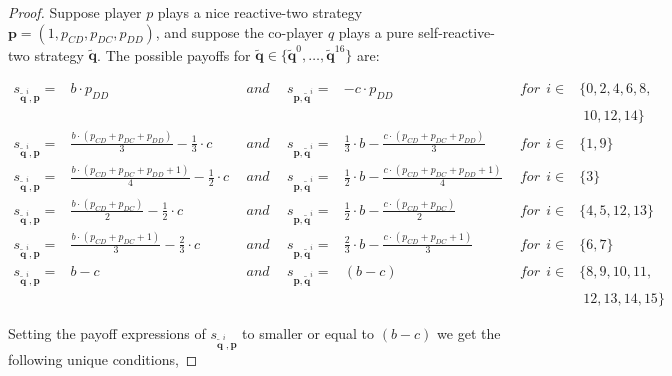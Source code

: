 \documentclass{article}
\theoremstyle{definition}
\begin{document}
\begin{proof}
Suppose player $p$ plays a nice reactive-two strategy $\mathbf{p} = (1, p_{CD},
p_{DC}, p_{DD})$, and suppose the co-player $q$ plays a pure self-reactive-two
strategy $\mathbf{\tilde{q}}$. The possible payoffs for
$\mathbf{\tilde{q}} \in \{\mathbf{\tilde{q}}^{0}, \dots, \mathbf{\tilde{q}}^{16}\}$
are:

\begin{equation*}\label{Eq:PayoffExpressionsReactiveTwo}
  \begin{array}{lcllccl}
    s_{\mathbf{\tilde{q}}^{i}, \mathbf{p}} = & b \cdot p_{DD} & ~~and~~ & s_{\mathbf{\mathbf{p}, \tilde{q}}^{i}} = & -c \cdot p_{DD} & ~~for~~ i \in & \{0, 2, 4, 6, 8, \\
    & & & & & & \; 10, 12, 14\} \\ [1em]
    s_{\mathbf{\tilde{q}}^{i}, \mathbf{p}} = & \frac{b \cdot (p_{CD} + p_{DC} + p_{DD})}{3} - \frac{1}{3} \cdot c  & ~~and~~ &  s_{\mathbf{\mathbf{p}, \tilde{q}}^{i}} = & \frac{1}{3} \cdot b - \frac{c \cdot \left(p_{CD} + p_{DC} + p_{DD}\right)}{3} & ~~for~~ i \in & \{1, 9\} \\ [1em]
    s_{\mathbf{\tilde{q}}^{i}, \mathbf{p}} = & \frac{b \cdot (p_{CD} + p_{DC} + p_{DD} + 1)}{4} - \frac{1}{2} \cdot c  & ~~and~~ &  s_{\mathbf{\mathbf{p}, \tilde{q}}^{i}} = & \frac{1}{2} \cdot b - \frac{c \cdot \left(p_{CD} + p_{DC} + p_{DD} + 1\right)}{4} & ~~for~~ i \in & \{3\} \\ [1em]
    s_{\mathbf{\tilde{q}}^{i}, \mathbf{p}} = & \frac{b \cdot (p_{CD} + p_{DC})}{2} - \frac{1}{2} \cdot c  & ~~and~~ &  s_{\mathbf{\mathbf{p}, \tilde{q}}^{i}} = &  \frac{1}{2} \cdot b - \frac{c \cdot \left(p_{CD} + p_{DC}\right)}{2} & ~~for~~ i \in & \{4, 5, 12, 13\} \\ [1em]
    s_{\mathbf{\tilde{q}}^{i}, \mathbf{p}} = & \frac{b \cdot (p_{CD} + p_{DC} + 1)}{3} - \frac{2}{3} \cdot c  & ~~and~~ &  s_{\mathbf{\mathbf{p}, \tilde{q}}^{i}} = & \frac{2}{3} \cdot b - \frac{c \cdot \left(p_{CD} + p_{DC} + 1\right)}{3} & ~~for~~ i \in & \{6, 7\}\\ [1em]
    s_{\mathbf{\tilde{q}}^{i}, \mathbf{p}} = & b - c  & ~~and~~ & s_{\mathbf{\mathbf{p}, \tilde{q}}^{i}} = & (b - c) & ~~for~~ i \in & \{8, 9, 10, 11,\\
    & & & & & & \; 12, 13, 14, 15\}
  \end{array}
\end{equation*}

Setting the payoff expressions of $s_{\mathbf{\tilde{q}}^{i}, \mathbf{p}}$ to
smaller or equal to $(b - c)$ we get the following unique conditions,


\end{proof}
\end{document}
